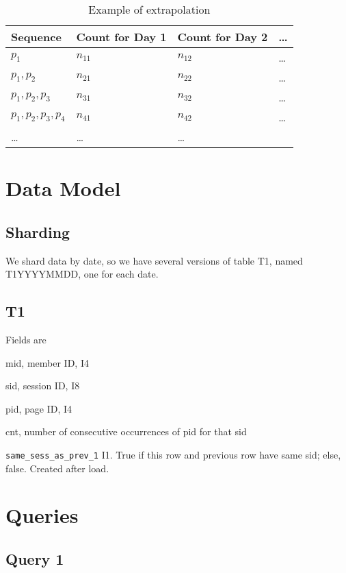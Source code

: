 \begin{table}[ht]
\centering
\begin{tabular}{|l|l|l|l|} \hline \hline 
{\bf Sequence} & {\bf Count for Day 1} & {\bf Count for Day 2 } &
\ldots  \\ \hline \hline
\(p_1\)                & \(n_{11}\) & \(n_{12}\) & \ldots \\ \hline
\(p_1, p_2\)           & \(n_{21}\) & \(n_{22}\) & \ldots \\ \hline
\(p_1, p_2, p_3\)      & \(n_{31}\) & \(n_{32}\) & \ldots \\ \hline
\(p_1, p_2, p_3, p_4\) & \(n_{41}\) & \(n_{42}\) & \ldots \\ \hline
\ldots & \ldots & \ldots & \\ \hline
\hline
\end{tabular}
\caption{Example of extrapolation}
\label{tbl_extrapolate}
\end{table}

\section{Data Model}

\subsection{Sharding}
We shard data by date, so we have several versions of table T1, named
T1YYYYMMDD, one for each date.

\subsection{T1}
\label{T1}

Fields are 
\be
\item mid, member ID, I4
\item sid, session ID, I8
\item pid, page ID, I4
\item cnt, number of consecutive occurrences of pid for that sid
\item \verb+same_sess_as_prev_1+ I1. True if this row and previous row
have same sid; else, false. Created after load. 
\ee

\section{Queries}
\label{Queries}

\subsection{Query 1}
\label{Query_1}

